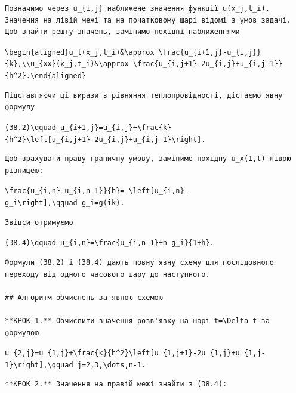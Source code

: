\documentclass[
  ukrainian,
]{article}
\begin{document}
\begin{verbatim}
Позначимо через u_{i,j} наближене значення функції u(x_j,t_i). Значення на лівій межі та на початковому шарі відомі з умов задачі. Щоб знайти решту значень, замінимо похідні наближеннями
\end{verbatim}

\texttt{\textbackslash{}begin\{aligned\}u\_t(x\_j,t\_i)\&\textbackslash{}approx\ \textbackslash{}frac\{u\_\{i+1,j\}-u\_\{i,j\}\}\{k\},\textbackslash{}\textbackslash{}u\_\{xx\}(x\_j,t\_i)\&\textbackslash{}approx\ \textbackslash{}frac\{u\_\{i,j+1\}-2u\_\{i,j\}+u\_\{i,j-1\}\}\{h\^{}2\}.\textbackslash{}end\{aligned\}}

\begin{verbatim}
Підставляючи ці вирази в рівняння теплопровідності, дістаємо явну формулу
\end{verbatim}

\texttt{(38.2)\textbackslash{}qquad\ u\_\{i+1,j\}=u\_\{i,j\}+\textbackslash{}frac\{k\}\{h\^{}2\}\textbackslash{}left{[}u\_\{i,j+1\}-2u\_\{i,j\}+u\_\{i,j-1\}\textbackslash{}right{]}.}

\begin{verbatim}
Щоб врахувати праву граничну умову, замінимо похідну u_x(1,t) лівою різницею:
\end{verbatim}

\texttt{\textbackslash{}frac\{u\_\{i,n\}-u\_\{i,n-1\}\}\{h\}=-\textbackslash{}left{[}u\_\{i,n\}-g\_i\textbackslash{}right{]},\textbackslash{}qquad\ g\_i=g(ik).}

\begin{verbatim}
Звідси отримуємо
\end{verbatim}

\texttt{(38.4)\textbackslash{}qquad\ u\_\{i,n\}=\textbackslash{}frac\{u\_\{i,n-1\}+h\ g\_i\}\{1+h\}.}

\begin{verbatim}
Формули (38.2) і (38.4) дають повну явну схему для послідовного переходу від одного часового шару до наступного.

## Алгоритм обчислень за явною схемою

**КРОК 1.** Обчислити значення розв'язку на шарі t=\Delta t за формулою
\end{verbatim}

\texttt{u\_\{2,j\}=u\_\{1,j\}+\textbackslash{}frac\{k\}\{h\^{}2\}\textbackslash{}left{[}u\_\{1,j+1\}-2u\_\{1,j\}+u\_\{1,j-1\}\textbackslash{}right{]},\textbackslash{}qquad\ j=2,3,\textbackslash{}dots,n-1.}

\begin{verbatim}
**КРОК 2.** Значення на правій межі знайти з (38.4):
\end{verbatim}
\end{document}
